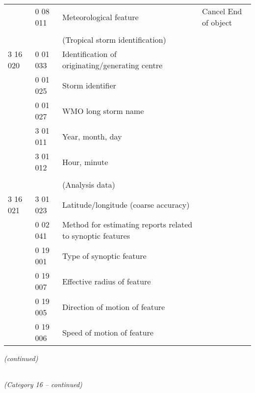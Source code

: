\begin{longtable}[]{@{}llll@{}}
& 0 08 011 & Meteorological feature & Cancel \textbf{\textbar{}} End of object\tabularnewline
& & &\tabularnewline
& & (Tropical storm identification) &\tabularnewline
3 16 020 & 0 01 033 & Identification of originating/generating centre &\tabularnewline
& 0 01 025 & Storm identifier &\tabularnewline
& 0 01 027 & WMO long storm name &\tabularnewline
& 3 01 011 & Year, month, day &\tabularnewline
& 3 01 012 & Hour, minute &\tabularnewline
& & &\tabularnewline
& & (Analysis data) &\tabularnewline
3 16 021 & 3 01 023 & Latitude/longitude (coarse accuracy) &\tabularnewline
& 0 02 041 & Method for estimating reports related to synoptic features &\tabularnewline
& 0 19 001 & Type of synoptic feature &\tabularnewline
& 0 19 007 & Effective radius of feature &\tabularnewline
& 0 19 005 & Direction of motion of feature &\tabularnewline
& 0 19 006 & Speed of motion of feature &\tabularnewline
\bottomrule
\end{longtable}

\emph{(continued)}

\emph{\\
(Category 16 -- continued)}

